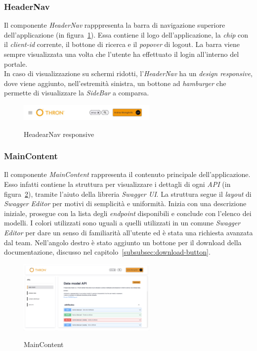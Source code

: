 \subsubsection{HeaderNav}\label{subsubsec:header-nav}
Il componente \textit{HeaderNav} rapppresenta la barra di navigazione superiore dell'applicazione (in figura~\ref{fig:header-nav-responsive}). Essa contiene il logo dell'applicazione, la \textit{chip} con il \textit{client-id}
corrente, il bottone di ricerca e il \textit{popover} di logout. 
La barra viene sempre visualizzata una volta che l'utente ha effettuato il login all'interno del portale.\\
In caso di visualizzazione su schermi ridotti, l'\textit{HeaderNav} ha un \textit{design responsive}, dove viene aggiunto, nell'estremità sinistra, un bottone ad \textit{hamburger}
che permette di visualizzare la \textit{SideBar} a comparsa.

\begin{figure}[ht]
  \centering
  \includegraphics[width=0.6\textwidth, alt={Barra di navigazione superiore con design responsive}]{images/frontend/HeaderRes.jpg}
  \caption{HeadearNav responsive}\label{fig:header-nav-responsive}
\end{figure}

\subsubsection{MainContent}\label{subsubsec:main-content}
Il componente \textit{MainContent} rappresenta il contenuto principale dell'applicazione. Esso infatti contiene la struttura per visualizzare i dettagli di ogni \textit{API} (in figura~\ref{fig:main-content}), tramite l'aiuto 
della libreria \textit{Swagger UI}.
La struttura segue il \textit{layout} di \textit{Swagger Editor} per motivi di semplicità e uniformità. Inizia con una descrizione iniziale, prosegue con la lista degli \textit{endpoint} disponibili e conclude con l'elenco dei modelli.
I colori utilizzati sono uguali a quelli utilizzati in un comune \textit{Swagger Editor} per dare un senso di familiarità all'utente ed è stata una richiesta avanzata dal team.
Nell'angolo destro è stato aggiunto un bottone per il download della documentazione, discusso nel capitolo~\ref{subsubsec:download-button}.
\begin{figure}[ht]
  \centering
  \includegraphics[width=0.6\textwidth, alt={Sezione per la visualizzazione dei dettagli di un API}]{images/frontend/DataModelView.jpg}
  \caption{MainContent}\label{fig:main-content}
\end{figure}
\pagebreak

